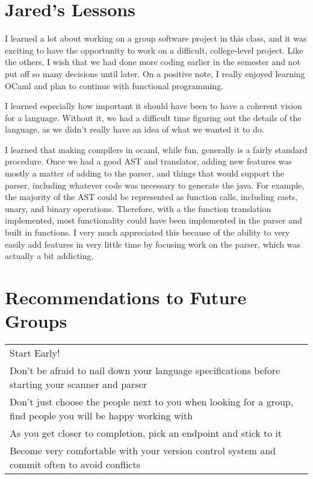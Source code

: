 \section{Jared's Lessons}
I learned a lot about working on a group software project in this class, and it was exciting to have the opportunity to work on a difficult, college-level project.  Like the others, I wish that we had done more coding earlier in the semester and not put off so many decisions until later.  On a positive note, I really enjoyed learning OCaml and plan to continue with functional programming.

I learned especially how important it should have been to have a coherent vision for a language.  Without it, we had a difficult time figuring out the details of the language, as we didn't really have an idea of what we wanted it to do.  

I learned that making compilers in ocaml, while fun, generally is a fairly standard procedure.  Once we had a good AST and translator, adding new features was mostly a matter of adding to the parser, and things that would support the parser, including whatever code was necessary to generate the java.  For example, the majority of the AST could be represented as function calls, including casts, unary, and binary operations.  Therefore, with a the function translation implemented, most functionality could have been implemented in the parser and built in functions.  I very much appreciated this because of the ability to very easily add features in very little time by focusing work on the parser, which was actually a bit addicting.

\section{Recommendations to Future Groups}
\begin{table}[here]
\begin{tabular} {l}
Start Early! \\
Don't be afraid to nail down your language specifications before starting your scanner and parser \\
Don't just choose the people next to you when looking for a group, find people you will be happy working with \\
As you get closer to completion, pick an endpoint and stick to it \\
Become very comfortable with your version control system and commit often to avoid conflicts \\
\end{tabular}
\end{table}

